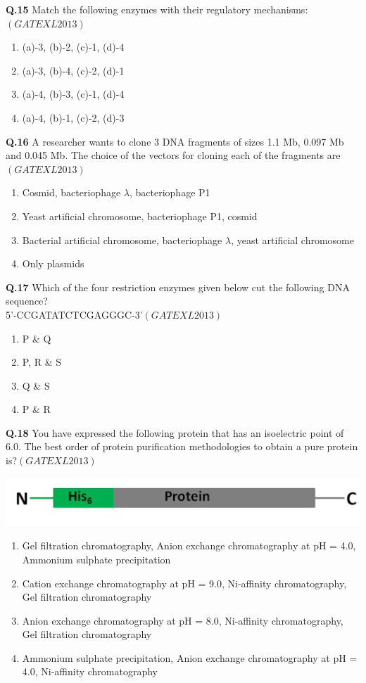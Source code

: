 \documentclass[12pt]{article}
\theoremstyle{remark}
\providecommand{\brak}[1]{\ensuremath{\left(#1\right)}}
\begin{document}
\textbf{Q.15} Match the following enzymes with their regulatory mechanisms:\hfill  \textit{\brak{GATE XL 2013}}
\begin{enumerate}
    \item (a)-3, (b)-2, (c)-1, (d)-4
    \item (a)-3, (b)-4, (c)-2, (d)-1
    \item (a)-4, (b)-3, (c)-1, (d)-4
    \item (a)-4, (b)-1, (c)-2, (d)-3
\end{enumerate}

\textbf{Q.16} A researcher wants to clone 3 DNA fragments of sizes 1.1 Mb, 0.097 Mb and 0.045 Mb. The choice of the vectors for cloning each of the fragments are\hfill  \textit{\brak{GATE XL 2013}}
\begin{enumerate}
    \item Cosmid, bacteriophage $\lambda$, bacteriophage P1
    \item Yeast artificial chromosome, bacteriophage P1, cosmid
    \item Bacterial artificial chromosome, bacteriophage $\lambda$, yeast artificial chromosome
    \item Only plasmids
\end{enumerate}

\textbf{Q.17} Which of the four restriction enzymes given below cut the following DNA sequence?\\
5’-CCGATATCTCGAGGGC-3’\hfill  \textit{\brak{GATE XL 2013}}
\begin{enumerate}
    \item P \& Q
    \item P, R \& S
    \item Q \& S
    \item P \& R
\end{enumerate}

\textbf{Q.18} You have expressed the following protein that has an isoelectric point of 6.0. The best order of protein purification methodologies to obtain a pure protein is?\hfill  \textit{\brak{GATE XL 2013}}
\begin{center}
    \includegraphics[width=0.5\columnwidth]{figs/Screenshot 2025-08-05 123543.png}
\end{center}
\begin{enumerate}
    \item Gel filtration chromatography, Anion exchange chromatography at pH = 4.0, Ammonium sulphate precipitation
    \item Cation exchange chromatography at pH = 9.0, Ni-affinity chromatography, Gel filtration chromatography
    \item Anion exchange chromatography at pH = 8.0, Ni-affinity chromatography, Gel filtration chromatography
    \item Ammonium sulphate precipitation, Anion exchange chromatography at pH = 4.0, Ni-affinity chromatography
\end{enumerate}
\end{document}
